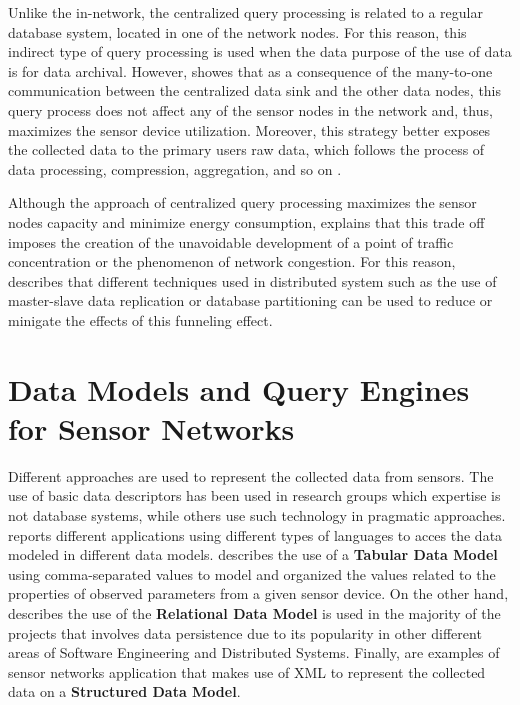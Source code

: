 Unlike the in-network, the centralized query processing is related to a regular
database system, located in one of the network nodes. For this reason, this
indirect type of query processing is used when the data purpose of the use of
data is for data archival. However, \cite{sn-storage02} showes that as a
consequence of the many-to-one communication between the centralized data sink
and the other data nodes, this query process does not affect any of the sensor
nodes in the network and, thus, maximizes the sensor device utilization. 
Moreover, this strategy better exposes the collected data to the primary users
raw data, which follows the process of data processing, compression,
aggregation, and so on \cite{sn-db-modeling02}.

Although the approach of centralized query processing maximizes the sensor
nodes capacity and minimize energy consumption, \cite{sn-storage02} explains
that this trade off imposes the creation of the unavoidable development of a
point of traffic concentration or the phenomenon of network congestion. For
this reason, \cite{sn-storage04} describes that different techniques used in 
distributed system such as the use of master-slave data replication or 
database partitioning \cite{db-partitioning-relational} can be used to reduce
or minigate the effects of this funneling effect.

\section{Data Models and Query Engines for Sensor Networks}
\label{sec:data-models}

Different approaches are used to represent the collected data from sensors. The
use of basic data descriptors has been used in research groups which expertise
is not database systems, while others use such technology in pragmatic
approaches. \cite{sn-programming-language} reports different applications using
different types of languages to acces the data modeled in different data
models. \cite{sn-provenance} describes the use of a \textbf{Tabular Data Model}
\cite{tabular-model} using comma-separated values to model and organized the
values related to the properties of observed parameters from a given sensor
device. On the other hand, \cite{sn-db-tinydb} describes the use of the
\textbf{Relational Data Model} \cite{relational-model} is used in the majority
of the projects that involves data persistence due to its popularity in other
different areas of Software Engineering and Distributed Systems. Finally,
\cite{sn-xml-usage01, sn-xml-usage02} are examples of sensor networks
application that makes use of XML \cite{xml} to represent the collected data
on a \textbf{Structured Data Model}.

